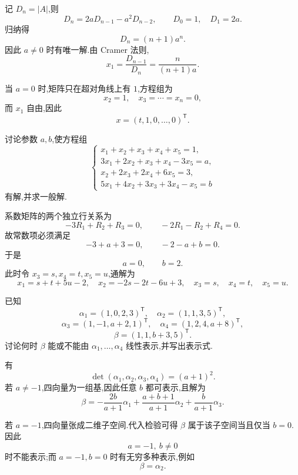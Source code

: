 \begin{solution}
记 $D_n=|A|$,则
\[
D_n=2aD_{n-1}-a^2D_{n-2},
\qquad
D_0=1,
\quad D_1=2a.
\]
归纳得
\[
\boxed{D_n=(n+1)a^n}.
\]
因此 $a\neq0$ 时有唯一解.由 Cramer 法则,
\[
x_1=\dfrac{D_{n-1}}{D_n}
=\boxed{\dfrac{n}{(n+1)a}}.
\]

当 $a=0$ 时,矩阵只在超对角线上有 $1$,方程组为
\[
x_2=1,\quad x_3=\cdots=x_n=0,
\]
而 $x_1$ 自由,因此
\[
\boxed{x=(t,1,0,\ldots,0)^{\mathsf T}}.
\]
\end{solution}

\begin{example}
讨论参数 $a,b$,使方程组
\[
\begin{cases}
x_1+x_2+x_3+x_4+x_5=1,\\
3x_1+2x_2+x_3+x_4-3x_5=a,\\
x_2+2x_3+2x_4+6x_5=3,\\
5x_1+4x_2+3x_3+3x_4-x_5=b
\end{cases}
\]
有解,并求一般解.
\end{example}
\exampleblank

\begin{solution}
系数矩阵的两个独立行关系为
\[
-3R_1+R_2+R_3=0,
\qquad
-2R_1-R_2+R_4=0.
\]
故常数项必须满足
\[
-3+a+3=0,
\qquad
-2-a+b=0.
\]
于是
\[
\boxed{a=0,\qquad b=2}.
\]
此时令 $x_3=s,x_4=t,x_5=u$,通解为
\[
\boxed{
 x_1=s+t+5u-2,
 \quad
 x_2=-2s-2t-6u+3,
 \quad
 x_3=s,
 \quad x_4=t,
 \quad x_5=u
 }.
\]
\end{solution}

\begin{example}
已知
\[
\alpha_1=(1,0,2,3)^{\mathsf T},
\quad
\alpha_2=(1,1,3,5)^{\mathsf T},
\]
\[
\alpha_3=(1,-1,a+2,1)^{\mathsf T},
\quad
\alpha_4=(1,2,4,a+8)^{\mathsf T},
\]
\[
\beta=(1,1,b+3,5)^{\mathsf T}.
\]
讨论何时 $\beta$ 能或不能由 $\alpha_1,\ldots,\alpha_4$ 线性表示,并写出表示式.
\end{example}
\exampleblank

\begin{solution}
有
\[
\det(\alpha_1,\alpha_2,\alpha_3,\alpha_4)=(a+1)^2.
\]
若 $a\neq-1$,四向量为一组基,因此任意 $b$ 都可表示,且解为
\[
\boxed{
\beta
=-\dfrac{2b}{a+1}\alpha_1
+\dfrac{a+b+1}{a+1}\alpha_2
+\dfrac{b}{a+1}\alpha_3
}.
\]

若 $a=-1$,四向量张成二维子空间.代入检验可得 $\beta$ 属于该子空间当且仅当 $b=0$.因此
\[
\boxed{a=-1,\ b\neq0}
\]
时不能表示;而 $a=-1,b=0$ 时有无穷多种表示,例如
\[
\boxed{\beta=\alpha_2}.
\]
\end{solution}

